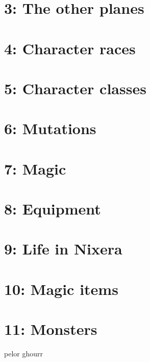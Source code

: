 \documentclass[a4paper]{article}
\begin{document}
\section{3: The other planes}

\section{4: Character races}

\section{5: Character classes}

\section{6: Mutations}

\section{7: Magic}

\section{8: Equipment}

\section{9: Life in Nixera}

\section{10: Magic items}

\section{11: Monsters}
pelor ghourr
\end{document}
